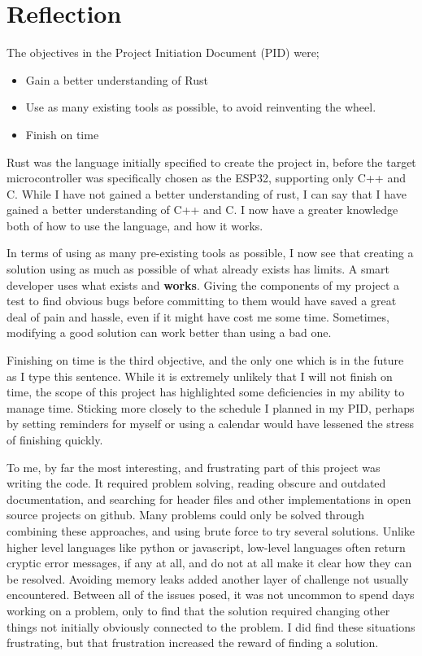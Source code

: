 \documentclass{article}
\begin{document}
\section{Reflection}

The objectives in the Project Initiation Document (PID) were;
\begin{itemize}
\item Gain a better understanding of Rust
\item Use as many existing tools as possible, to avoid reinventing the wheel.
\item Finish on time
\end{itemize}

Rust was the language initially specified to create the project in, before the target microcontroller was specifically chosen as the ESP32, supporting only C++ and C. While I have not gained a better understanding of rust, I can say that I have gained a better understanding of C++ and C. I now have a greater knowledge both of how to use the language, and how it works.

In terms of using as many pre-existing tools as possible, I now see that creating a solution using as much as possible of what already exists has limits. A smart developer uses what exists and \textbf{works}. Giving the components of my project a test to find obvious bugs before committing to them would have saved a great deal of pain and hassle, even if it might have cost me some time. Sometimes, modifying a good solution can work better than using a bad one.

Finishing on time is the third objective, and the only one which is in the future as I type this sentence. While it is extremely unlikely that I will not finish on time, the scope of this project has highlighted some deficiencies in my ability to manage time. Sticking more closely to the schedule I planned in my PID, perhaps by setting reminders for myself or using a calendar would have lessened the stress of finishing quickly.

To me, by far the most interesting, and frustrating part of this project was writing the code. It required problem solving, reading obscure and outdated documentation, and searching for header files and other implementations in open source projects on github. Many problems could only be solved through combining these approaches, and using brute force to try several solutions. Unlike higher level languages like python or javascript, low-level languages often return cryptic error messages, if any at all, and do not at all make it clear how they can be resolved. Avoiding memory leaks added another layer of challenge not usually encountered. Between all of the issues posed, it was not uncommon to spend days working on a problem, only to find that the solution required changing other things not initially obviously connected to the problem. I did find these situations frustrating, but that frustration increased the reward of finding a solution.
\end{document}
